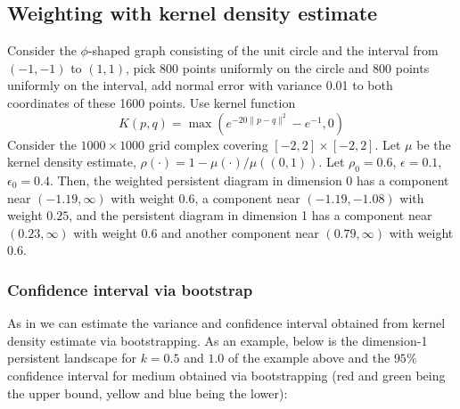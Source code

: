 \documentclass[11pt]{article}
\theoremstyle{plain}
\theoremstyle{definition}
\theoremstyle{definition}
\theoremstyle{definition}
\theoremstyle{definition}
\theoremstyle{definition}
\theoremstyle{definition}
\theoremstyle{definition}
\theoremstyle{definition}
\begin{document}
\subsection{Weighting with kernel density estimate}

Consider the $\phi$-shaped graph consisting of the unit circle and the interval from $(-1, -1)$ to $(1,1)$, pick 800 points uniformly on the circle and 800 points uniformly on the interval, add normal error with variance 0.01 to both coordinates of these 1600 points. Use kernel function 
\[K(p, q)=\max(e^{-20\|p-q\|^2}-e^{-1},0)\]
Consider the $1000\times 1000$ grid complex covering $[-2,2]\times[-2,2]$. Let $\mu$ be the kernel density estimate, $\rho(\cdot)=1-\mu(\cdot)/\mu((0,1))$. Let $\rho_0=0.6$, $\epsilon=0.1$, $\epsilon_0=0.4$. Then, the weighted persistent diagram in dimension 0 has a component near $(-1.19,\infty)$ with weight 0.6, a component near $(-1.19, -1.08)$ with weight $0.25$, and the persistent diagram in dimension 1 has a component near $(0.23,\infty)$ with weight $0.6$ and another component near $(0.79,\infty)$ with weight $0.6$. 

\subsubsection{Confidence interval via bootstrap}

As in \cite{C} we can estimate the variance and confidence interval obtained from kernel density estimate via bootstrapping. As an example, below is the dimension-1 persistent landscape for $k=0.5$ and $1.0$ of the example above and the $95\%$ confidence interval for medium obtained via bootstrapping (red and green being the upper bound, yellow and blue being the lower):
\end{document}
